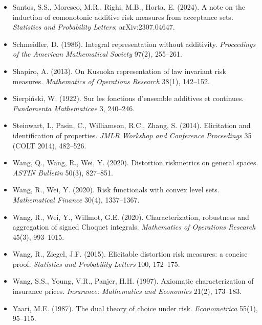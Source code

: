 \begin{itemize}
\item Santos, S.S., Moresco, M.R., Righi, M.B., Horta, E. (2024). A note on the induction of comonotonic additive risk measures from acceptance sets. \emph{Statistics and Probability Letters}; arXiv:2307.04647.
\item Schmeidler, D. (1986). Integral representation without additivity. \emph{Proceedings of the American Mathematical Society} 97(2), 255--261.
\item Shapiro, A. (2013). On Kusuoka representation of law invariant risk measures. \emph{Mathematics of Operations Research} 38(1), 142--152.
\item Sierpi\'nski, W. (1922). Sur les fonctions d'ensemble additives et continues. \emph{Fundamenta Mathematicae} 3, 240--246.
\item Steinwart, I., Pasin, C., Williamson, R.C., Zhang, S. (2014). Elicitation and identification of properties. \emph{JMLR Workshop and Conference Proceedings} 35 (COLT 2014), 482--526.
\item Wang, Q., Wang, R., Wei, Y. (2020). Distortion riskmetrics on general spaces. \emph{ASTIN Bulletin} 50(3), 827--851.
\item Wang, R., Wei, Y. (2020). Risk functionals with convex level sets. \emph{Mathematical Finance} 30(4), 1337--1367.
\item Wang, R., Wei, Y., Willmot, G.E. (2020). Characterization, robustness and aggregation of signed Choquet integrals. \emph{Mathematics of Operations Research} 45(3), 993--1015.
\item Wang, R., Ziegel, J.F. (2015). Elicitable distortion risk measures: a concise proof. \emph{Statistics and Probability Letters} 100, 172--175.
\item Wang, S.S., Young, V.R., Panjer, H.H. (1997). Axiomatic characterization of insurance prices. \emph{Insurance: Mathematics and Economics} 21(2), 173--183.
\item Yaari, M.E. (1987). The dual theory of choice under risk. \emph{Econometrica} 55(1), 95--115.
\end{itemize}